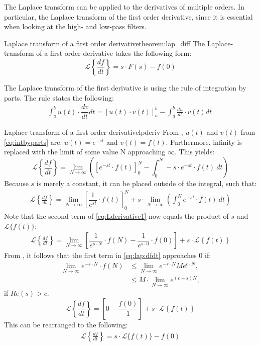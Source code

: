 \noindent The Laplace transform can be applied to the derivatives of multiple orders. In particular, the Laplace transform of the first order derivative, since it is essential when looking at the high- and low-pass filters.
\begin{theorem}{Laplace transform of a first order derivative}{theorem:lap_diff}
The Laplace-transform of a first order derivative takes the following form:
$$\mathcal{L} \left\{\frac{df}{dt} \right\} = s \cdot F(s)-f(0)$$
\end{theorem}
\noindent The Laplace transform of the first derivative is using the rule of integration by parts. The rule states the following:
\begin{align}
\int_{a}^{b}{u(t) \cdot \dfrac{dv}{dt}dt}=\left[u(t) \cdot v(t) \right]_{a}^{b}-\int_{a}^{b} \frac{du}{dt}\cdot v(t) dt\
\label{eq:intbyparts}
\end{align}
\begin{prof}{Laplace transform of a first order derivative}{lpderiv}
From \Cref{lpdef}, $u(t)$ and $v(t)$ from \eqref{eq:intbyparts} are: $u(t) = e^{-st}$ and $v(t) = f(t)$. Furthermore, infinity is replaced with the limit of some value N approaching $\infty$. This yields:
$$\mathcal{L} \left\{\frac{df}{dt} \right\}=\lim_{N \to \infty} \left(\left[e^{-st}\cdot f(t)\right]_{0}^{N}-\int_{0}^{N} -s\cdot e^{-st}\cdot f(t)\ dt \right)$$
Because $s$ is merely a constant, it can be placed outside of the integral, such that:
\begin{align}
\mathcal{L} \left\{\frac{df}{dt} \right\}=\lim_{N \to \infty} \left[\dfrac{1}{e^{st}}\cdot f(t)\right]_{0}^{N}+ s \cdot \lim_{N \to \infty} \left( \int_{0}^{N}e^{-st}\cdot f(t)\ dt \right)\label{eq:Lderivative1}
\end{align}
Note that the second term of \eqref{eq:Lderivative1} now equals the product of $s$ and $\mathcal{L}\{f(t)\}$:
\begin{align}
\mathcal{L} \left\{\frac{df}{dt} \right\} = \lim_{N \to \infty}\left[\dfrac{1}{e^{s\cdot N}}\cdot f(N)-\dfrac{1}{e^{s\cdot 0}}\cdot f(0)\right]+s\cdot \mathcal{L} \left\{f(t) \right\} \label{eq:lap:dfdt}
\end{align}
From , it follows that the first term in \eqref{eq:lap:dfdt} approaches $0$ if:
\begin{align*}
\lim_{N \to \infty} e^{-s\cdot N}\cdot f(N) &\leq \lim_{N \to \infty} e^{-s\cdot N} Me^{c\cdot N},\\
&\leq M \cdot \lim_{N \to \infty} e^{(c-s)N},
\end{align*}
if $Re(s) > c$.
$$\mathcal{L} \left\{\frac{df}{dt} \right\} = \left[0-\dfrac{f(0)}{1}\right]+s\cdot \mathcal{L} \left\{f(t) \right\}$$
This can be rearranged to the following:
\begin{align*}
\mathcal{L} \left\{\frac{df}{dt} \right\} = s\cdot \mathcal{L}\{f(t)\}-f(0)
\end{align*}

\end{prof}
